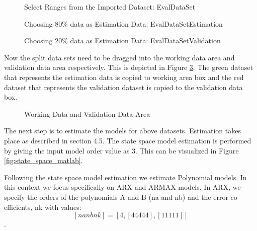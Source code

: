 \documentclass[article,type=msc,colorback,12pt,accentcolor=tud8b,table]{tudthesis}
\begin{document}
\begin{figure}[H]
	\begin{center}
		\makebox[\textwidth]{\texttt{[image: E7]}}
	\end{center}
	\caption{Select Ranges from the Imported Dataset: EvalDataSet}
		\label{fig:select_range_estimation_validation}
\end{figure}


  \begin{figure}[H]
	  	  	  	\begin{center}
	  	  	  		\makebox[\textwidth]{\texttt{[image: E8]}}
	  	  	  	\end{center}
	  	  	  	\caption{Choosing 80\% data as Estimation Data: EvalDataSetEstimation}
					\label{fig:80_estimation}
    	\begin{center}
    		\makebox[\textwidth]{\texttt{[image: E9]}}
    	\end{center}
    	\caption{Choosing 20\% data as Estimation Data: EvalDataSetValidation}
    	\label{fig:20_validation}
    \end{figure}	
	
	Now the split data sets need to be dragged into the working data area and validation data area respectively. This is depicted in Figure \ref{fig:working_validation_area}. The green dataset that represents the estimation data is copied to working area box and the red dataset that represents the validation dataset is copied to the validation data box.
	
	    \begin{figure}[H]
	    	\begin{center}
	    		\makebox[\textwidth]{\texttt{[image: E10]}}
	    	\end{center}
	    	\caption{Working Data and Validation Data Area}
	    		\label{fig:working_validation_area}
	    \end{figure}
	
	The next step is to estimate the models for above datasets. Estimation takes place as described in section 4.5. The state space model estimation is performed by giving the input model order value as 3. This can be visualized in Figure \ref{fig:state_space_matlab}.
	
	Following the state space model estimation we estimate Polynomial models. In this context we focus specifically on ARX and ARMAX models. In ARX, we specify the orders of the polynomials A and B (na and nb) and the error co-efficients, nk with values: $$ [na nb nk] = [ 4, [ 4 4 4 4 4 ], [ 1 1 1 1 1 ] ]$$. 
	
\end{document}
